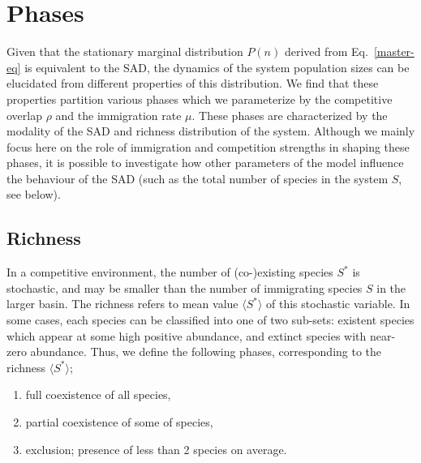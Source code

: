 \documentclass[%
 amsmath,amssymb,
reprint,%
linenumbers]{revtex4-2}
\begin{document}
\section{Phases} 
\label{sec:Phases}
Given that the stationary marginal distribution $P(n)$ derived from Eq.~\eqref{master-eq} is equivalent to the SAD, the dynamics of the system population sizes can be elucidated from different properties of this distribution.
We find that these properties partition various phases which we parameterize by the competitive overlap $\rho$ and the immigration rate $\mu$.
These phases are characterized by the modality of the SAD and richness distribution of the system.
Although we mainly focus here on the role of immigration and competition strengths in shaping these phases, it is possible to investigate how other parameters of the model influence the behaviour of the SAD (such as the total number of species in the system $S$, see below).

\subsection{Richness}

In a competitive environment, the number of (co-)existing species $S^*$ is stochastic, and may be smaller than the number of immigrating species $S$ in the larger basin. 
The richness refers to mean value $\langle S^*\rangle$ of this stochastic variable.
%
In some cases, each species can be classified into one of two sub-sets: existent species which appear at some high positive abundance, and extinct species with near-zero abundance.
%
Thus, we define the following phases, corresponding to the richness {$\langle S^* \rangle$};
\begin{enumerate}[label=(\alph*)]
    \item full coexistence of all species,
    \item partial coexistence of some of species,
    \item exclusion; presence of less than 2 species on average.
\end{enumerate}

\end{document}
